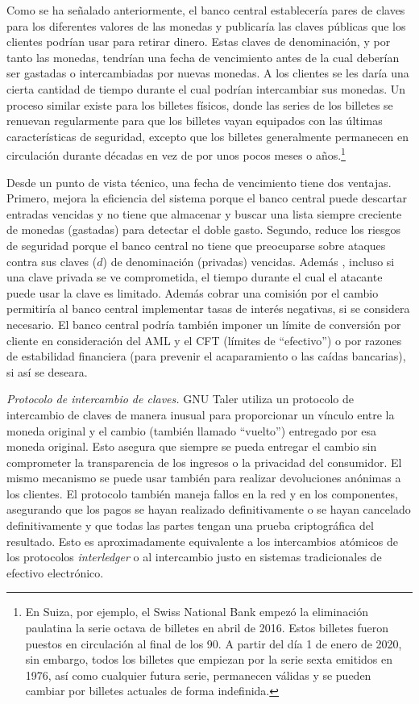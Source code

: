 \documentclass[a4paper,10pt]{article} %
\begin{document}
Como se ha señalado anteriormente, el banco central establecería pares
de claves para los diferentes valores de las monedas y publicaría las
claves públicas que los clientes podrían usar para retirar dinero. Estas
claves de denominación, y por tanto las monedas, tendrían una fecha de
vencimiento antes de la cual deberían ser gastadas o intercambiadas por
nuevas monedas. A los clientes se les daría una cierta cantidad de
tiempo durante el cual podrían intercambiar sus monedas. Un proceso
similar existe para los billetes físicos, donde las series de los
billetes se renuevan regularmente para que los billetes vayan equipados
con las últimas características de seguridad, excepto que los billetes
generalmente permanecen en circulación durante décadas en vez de por
unos pocos meses o años.\footnote{En Suiza, por ejemplo, el Swiss
National Bank empezó la eliminación paulatina la serie octava de
billetes en abril de 2016. Estos billetes fueron puestos en
circulación al final de los 90. A partir del día 1 de enero de 2020,
sin embargo, todos los billetes que empiezan por la serie sexta
emitidos en 1976, así como cualquier futura serie, permanecen válidas
y se pueden cambiar por billetes actuales de forma indefinida.}

Desde un punto de vista técnico, una fecha de vencimiento tiene dos
ventajas. Primero, mejora la eficiencia del sistema porque el banco
central puede descartar entradas vencidas y no tiene que almacenar y
buscar una lista siempre creciente de monedas (gastadas) para detectar
el doble gasto. Segundo, reduce los riesgos de seguridad porque el banco
central no tiene que preocuparse sobre ataques contra sus claves
($d$) de denominación (privadas) vencidas. Además , incluso si una
clave privada se ve comprometida, el tiempo durante el cual el atacante
puede usar la clave es limitado. Además cobrar una comisión por el
cambio permitiría al banco central implementar tasas de interés
negativas, si se considera necesario. El banco central podría también
imponer un límite de conversión por cliente en consideración del AML y
el CFT (límites de ``efectivo'') o por razones de estabilidad
financiera (para prevenir el acaparamiento o las caídas bancarias), si
así se deseara.

\emph{Protocolo de intercambio de claves.} GNU Taler utiliza un
protocolo de intercambio de claves de manera inusual para proporcionar
un vínculo entre la moneda original y el cambio (también llamado
``vuelto'') entregado por esa moneda original. Esto asegura que siempre
se pueda entregar el cambio sin comprometer la transparencia de los
ingresos o la privacidad del consumidor. El mismo mecanismo se puede
usar también para realizar devoluciones anónimas a los clientes. El
protocolo también maneja fallos en la red y en los componentes,
asegurando que los pagos se hayan realizado definitivamente o se hayan
cancelado definitivamente y que todas las partes tengan una prueba
criptográfica del resultado. Esto es aproximadamente equivalente a los
intercambios atómicos de los protocolos \emph{interledger} o al
intercambio justo en sistemas tradicionales de efectivo electrónico.
\end{document}
